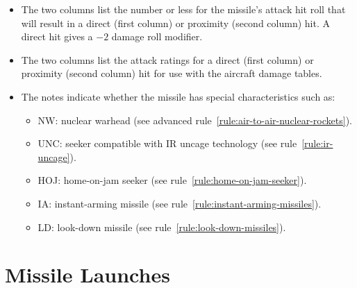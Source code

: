{\begin{itemize}
    \item {} The two columns list the number or less for the missile’s attack hit roll that will result in a direct (first column) or proximity (second column) hit. A direct hit gives a $-2$ damage roll modifier.

    \item {} The two columns list the attack ratings for a direct (first column) or proximity (second column) hit for use with the aircraft damage tables.

    \item {} The notes indicate whether the missile has special characteristics such as:
    \begin{itemize}
        \item NW: nuclear warhead (see advanced rule~\ref{rule:air-to-air-nuclear-rockets}).
    \item UNC: seeker compatible with IR uncage technology (see rule~\ref{rule:ir-uncage}).
    \item HOJ: home-on-jam seeker (see rule~\ref{rule:home-on-jam-seeker}).
    \item IA: instant-arming missile (see rule~\ref{rule:instant-arming-missiles}).
    \item LD: look-down missile (see rule~\ref{rule:look-down-missiles}).
    
    \end{itemize}

\end{itemize}
}

\section{Missile Launches}
\label{rule:missile-launches}




